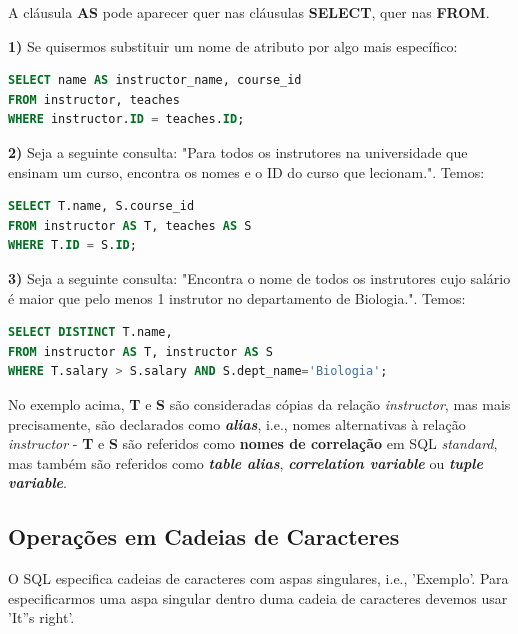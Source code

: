 \documentclass[oneside]{book}
\theoremstyle{definition}
\begin{document}
A cláusula \textbf{AS} pode aparecer quer nas cláusulas \textbf{SELECT}, quer nas \textbf{FROM}.

\textbf{1)} Se quisermos substituir um nome de atributo por algo mais específico:
\begin{lstlisting}[language=SQL, morekeywords={REFERENCES, REFRESH, MATERIALIZED, CONCURRENTLY}, framesep=8pt, xleftmargin=40pt, framexleftmargin=40pt, frame=tb, framerule=0pt]
SELECT name AS instructor_name, course_id
FROM instructor, teaches
WHERE instructor.ID = teaches.ID;
\end{lstlisting}

\textbf{2)} Seja a seguinte consulta: "Para todos os instrutores na universidade que ensinam um curso, encontra os nomes e o ID do curso que lecionam.". Temos:
\begin{lstlisting}[language=SQL, morekeywords={REFERENCES, REFRESH, MATERIALIZED, CONCURRENTLY}, framesep=8pt, xleftmargin=40pt, framexleftmargin=40pt, frame=tb, framerule=0pt]
SELECT T.name, S.course_id
FROM instructor AS T, teaches AS S
WHERE T.ID = S.ID;
\end{lstlisting}

\textbf{3)} Seja a seguinte consulta: "Encontra o nome de todos os instrutores cujo salário é maior que pelo menos 1 instrutor no departamento de Biologia.". Temos:
\begin{lstlisting}[language=SQL, morekeywords={REFERENCES, REFRESH, MATERIALIZED, CONCURRENTLY}, framesep=8pt, xleftmargin=40pt, framexleftmargin=40pt, frame=tb, framerule=0pt]
SELECT DISTINCT T.name,
FROM instructor AS T, instructor AS S
WHERE T.salary > S.salary AND S.dept_name='Biologia';
\end{lstlisting}

No exemplo acima, \textbf{T} e \textbf{S} são consideradas cópias da relação \textit{instructor}, mas mais precisamente, são declarados como \textbf{\textit{alias}}, i.e., nomes alternativas à relação \textit{instructor} - \textbf{T} e \textbf{S} são referidos como \textbf{nomes de correlação} em SQL \textit{standard}, mas também são referidos como \textbf{\textit{table alias}}, \textbf{\textit{correlation variable}} ou \textbf{\textit{tuple variable}}.

\subsection{Operações em Cadeias de Caracteres}

O SQL especifica cadeias de caracteres com aspas singulares, i.e., 'Exemplo'. Para especificarmos uma aspa singular dentro duma cadeia de caracteres devemos usar 'It''s right'.
\end{document}
